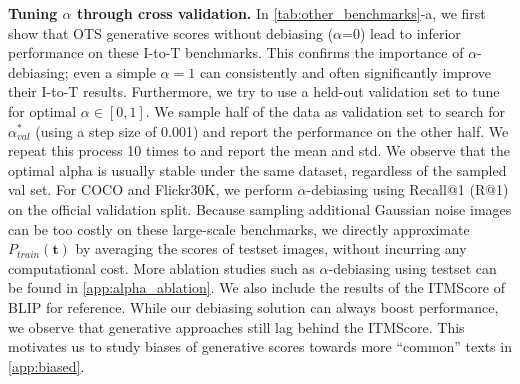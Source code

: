 \documentclass{article} \usepackage{iclr2024_conference,times}
\begin{document}
{\bf Tuning $\alpha$ through cross validation.} In \autoref{tab:other_benchmarks}-a, we first show that OTS generative scores without debiasing ($\alpha$=0) lead to inferior performance on these I-to-T benchmarks. This confirms the importance of $\alpha$-debiasing; even a simple $\alpha=1$ can consistently and often significantly improve their I-to-T results. Furthermore, we try to use a held-out validation set to tune for optimal $\alpha \in [0, 1]$. We sample half of the data as validation set to search for $\alpha^{\ast}_{val}$ (using a step size of 0.001) and report the performance on the other half. We repeat this process 10 times to and report the mean and std. We observe that the optimal alpha is usually stable under the same dataset, regardless of the sampled val set.
For COCO and Flickr30K, we perform $\alpha$-debiasing using Recall@1 (R@1) on the official validation split. Because sampling additional Gaussian noise images can be too costly on these large-scale benchmarks, we directly approximate $P_{train}(\mathbf{t})$ by averaging the scores of testset images, without incurring any computational cost.  More ablation studies such as $\alpha$-debiasing using testset can be found in \autoref{app:alpha_ablation}. We also include the results of the ITMScore of BLIP for reference. While our debiasing solution can always boost performance, we observe that generative approaches still lag behind the ITMScore. This motivates us to study biases of generative scores towards more ``common'' texts in \autoref{app:biased}.
\end{document}
